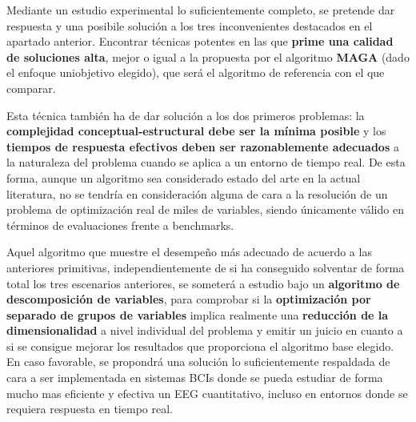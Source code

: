 Mediante un estudio experimental lo suficientemente completo, se pretende dar respuesta y una posibile solución a los tres inconvenientes destacados en el apartado anterior. Encontrar técnicas potentes en las que \textbf{prime una calidad de soluciones alta}, mejor o igual a la propuesta por el algoritmo \textbf{MAGA} (dado el enfoque uniobjetivo elegido), que será el algoritmo de referencia con el que comparar. 

Esta técnica también ha de dar solución a los dos primeros problemas: la \textbf{complejidad conceptual-estructural debe ser la mínima posible} y los \textbf{tiempos de respuesta efectivos deben ser razonablemente adecuados} a la naturaleza del problema cuando se aplica a un entorno de tiempo real. De esta forma, aunque un algoritmo sea considerado estado del arte en la actual literatura, no se tendría en consideración alguna de cara a la resolución de un problema de optimización real de miles de variables, siendo únicamente válido en términos de evaluaciones frente a benchmarks.

Aquel algoritmo que muestre el desempeño más adecuado de acuerdo a las anteriores primitivas, independientemente de si ha conseguido solventar de forma total los tres escenarios anteriores, se someterá a estudio bajo un \textbf{algoritmo de descomposición de variables}, para comprobar si la \textbf{optimización por separado de grupos de variables} implica realmente una \textbf{reducción de la dimensionalidad} a nivel individual del problema y emitir un juicio en cuanto a si se consigue mejorar los resultados que proporciona el algoritmo base elegido. En caso favorable, se propondrá una solución lo suficientemente respaldada de cara a ser implementada en sistemas BCIs donde se pueda estudiar de forma mucho mas eficiente y efectiva un EEG cuantitativo, incluso en entornos donde se requiera respuesta en tiempo real.